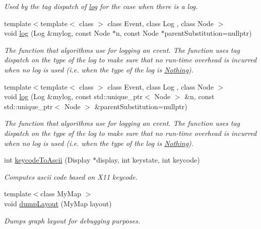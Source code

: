 \begin{DoxyCompactItemize}
\begin{DoxyCompactList}\small\item\em Used by the tag dispatch of \hyperlink{namespaceslb_1_1core_1_1ui_acdeb0db1847459cac6f4eeb22bbb5998}{log} for the case when there is a log. \end{DoxyCompactList}\item 
{\footnotesize template$<$template$<$ class $>$ class Event, class Log , class Node $>$ }\\void \hyperlink{namespaceslb_1_1core_1_1ui_acdeb0db1847459cac6f4eeb22bbb5998}{log} (Log \&mylog, const Node $\ast$n, const Node $\ast$parent\+Substitution=nullptr)
\begin{DoxyCompactList}\small\item\em The function that algorithms use for logging an event. The function uses tag dispatch on the type of the log to make sure that no run-\/time overhead is incurred when no log is used (i.\+e. when the type of the log is \hyperlink{structslb_1_1Nothing}{Nothing}). \end{DoxyCompactList}\item 
{\footnotesize template$<$template$<$ class $>$ class Event, class Log , class Node $>$ }\\void \hyperlink{namespaceslb_1_1core_1_1ui_a3459f2fe04f5f976f00822e93c53b1af}{log} (Log \&mylog, const std\+::unique\+\_\+ptr$<$ Node $>$ \&n, const std\+::unique\+\_\+ptr$<$ Node $>$ \&parent\+Substitution=nullptr)
\begin{DoxyCompactList}\small\item\em The function that algorithms use for logging an event. The function uses tag dispatch on the type of the log to make sure that no run-\/time overhead is incurred when no log is used (i.\+e. when the type of the log is \hyperlink{structslb_1_1Nothing}{Nothing}). \end{DoxyCompactList}\item 
int \hyperlink{namespaceslb_1_1core_1_1ui_aab410e0c9bc9305ddf1d568528dede88}{keycode\+To\+Ascii} (Display $\ast$display, int keystate, int keycode)
\begin{DoxyCompactList}\small\item\em Computes ascii code based on X11 keycode. \end{DoxyCompactList}\item 
{\footnotesize template$<$class My\+Map $>$ }\\void \hyperlink{namespaceslb_1_1core_1_1ui_ac18189f5a7349b733ec4efc97186e2fc}{dump\+Layout} (My\+Map layout)
\begin{DoxyCompactList}\small\item\em Dumps graph layout for debugging purposes. \end{DoxyCompactList}\item 

\end{DoxyCompactItemize}
